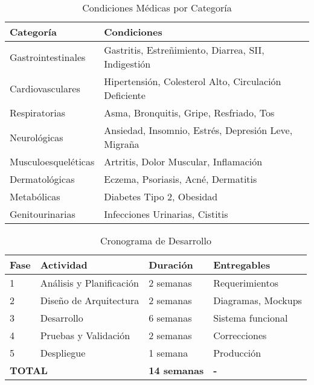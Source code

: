 \documentclass[12pt,a4paper]{article}
\begin{document}
\begin{table}[H]
\centering
\caption{Condiciones Médicas por Categoría}
\label{tab:condiciones}
\begin{tabular}{|p{4cm}|p{9cm}|}
\hline
\textbf{Categoría} & \textbf{Condiciones} \\ \hline
Gastrointestinales & Gastritis, Estreñimiento, Diarrea, SII, Indigestión \\ \hline
Cardiovasculares & Hipertensión, Colesterol Alto, Circulación Deficiente \\ \hline
Respiratorias & Asma, Bronquitis, Gripe, Resfriado, Tos \\ \hline
Neurológicas & Ansiedad, Insomnio, Estrés, Depresión Leve, Migraña \\ \hline
Musculoesqueléticas & Artritis, Dolor Muscular, Inflamación \\ \hline
Dermatológicas & Eczema, Psoriasis, Acné, Dermatitis \\ \hline
Metabólicas & Diabetes Tipo 2, Obesidad \\ \hline
Genitourinarias & Infecciones Urinarias, Cistitis \\ \hline
\end{tabular}
\end{table}

\begin{table}[H]
\centering
\caption{Cronograma de Desarrollo}
\label{tab:cronograma}
\begin{tabular}{|p{1.5cm}|p{4.5cm}|p{2.5cm}|p{4cm}|}
\hline
\textbf{Fase} & \textbf{Actividad} & \textbf{Duración} & \textbf{Entregables} \\ \hline
1 & Análisis y Planificación & 2 semanas & Requerimientos \\ \hline
2 & Diseño de Arquitectura & 2 semanas & Diagramas, Mockups \\ \hline
3 & Desarrollo & 6 semanas & Sistema funcional \\ \hline
4 & Pruebas y Validación & 2 semanas & Correcciones \\ \hline
5 & Despliegue & 1 semana & Producción \\ \hline
\multicolumn{2}{|l|}{\textbf{TOTAL}} & \textbf{14 semanas} & \textbf{-} \\ \hline
\end{tabular}
\end{table}
\end{document}
